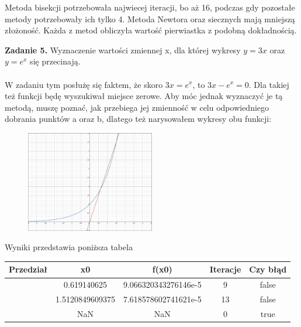 \documentclass[15pt, a4paper]{article}
\begin{document}
\noindent Metoda bisekcji potrzebowała najwiecej iteracji, bo aż 16, podczas gdy pozostałe metody potrzebowały ich tylko 4. Metoda Newtora oraz siecznych mają mniejszą złożoność. Każda z metod obliczyła wartość pierwiastka z podobną dokładnością.

\vspace{0.5cm}

\noindent\hrulefill

\vspace{0.5cm}


\noindent\textbf{Zadanie 5.} Wyznaczenie wartości zmiennej x, dla której wykresy \( y = 3x \) oraz \( y = e^x \) się przecinają.\\\\
\noindent W zadaniu tym posłużę się faktem, że skoro \(3x = e^x \), to \(3x - e^x = 0 \). Dla takiej też funkcji będę wyszukiwał miejsce zerowe. Aby móc jednak wyznaczyć je tą metodą, muszę poznać, jak przebiega jej zmienność w celu odpowiedniego dobrania punktów a oraz b, dlatego też narysowałem wykresy obu funkcji:\\

\begin{figure}[h]
    \centering
    \includegraphics[width=0.5\textwidth]{img/wykreszad5.png}
\end{figure}

\noindent Wyniki przedstawia poniższa tabela

\begin{table}[ht]
\begin{adjustbox}{max width=\textwidth}
\begin{tabular}{|c|c|c|c|c|}
    \hline
    \textbf{Przedział} & \textbf{x0} & \textbf{f(x0)} & \textbf{Iteracje} & \textbf{Czy błąd} \\
    \hline
    [0.0, 1.0] & 0.619140625 & 9.066320343276146e-5 & 9 & false \\
    \hline
    [1.0, 2.0] & 1.5120849609375 & 7.618578602741621e-5 & 13 & false \\
    \hline
    [0.0, 2.0] & NaN & NaN & 0 & true \\
    \hline
\end{tabular}
\end{adjustbox}
\end{table}
\end{document}
